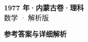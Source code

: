 \documentclass[zihao=-4, a4paper]{ctexart}
\begin{document}
\begin{center}
  {\Large\bfseries 1977 年·内蒙古卷·理科}\\[4pt]
  {\large 数学 · 解析版}
\end{center}
\medskip
{}

\clearpage
{}
\begin{center}{\Large\bfseries 参考答案与详细解析}\end{center}
\medskip

\end{document}
